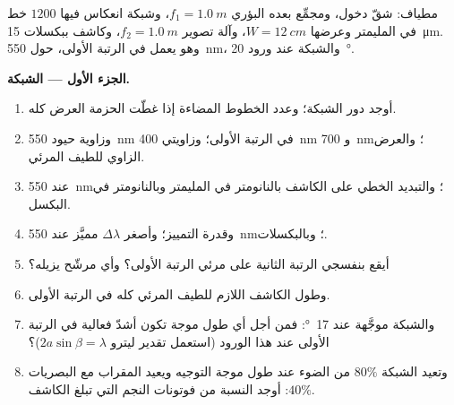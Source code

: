 \begin{problem}
\label{pb:b2:gratings:1}

مطياف: شقّ دخول، ومجمِّع بعده البؤري $f_1 =
\qty{1.0}{m}$، وشبكة انعكاس فيها $1200$ خط في المليمتر وعرضها $W =
\qty{12}{cm}$، وآلة تصوير $f_2 = \qty{1.0}{m}$، وكاشف ببكسلات \qty{15}{\micro m}.
وهو يعمل في الرتبة الأولى، حول \qty{550}{nm}، والشبكة
عند ورود \qty{20}{\degree}.

\medskip
\noindent\textbf{الجزء الأول --- الشبكة.}
\begin{enumerate}
  \item أوجد دور الشبكة؛ وعدد الخطوط المضاءة إذا غطّت الحزمة
        العرض كله.
  \item وزاوية حيود \qty{550}{nm} في الرتبة الأولى؛ وزاويتي
        \qty{400}{nm} و \qty{700}{nm}؛ والعرض الزاوي للطيف
        المرئي.
  \item {} عند \qty{550}{nm}؛ والتبديد الخطي على
        الكاشف بالنانومتر في المليمتر وبالنانومتر في البكسل.
  \item وقدرة التمييز؛ وأصغر $\Delta\lambda$ مميَّز عند \qty{550}{nm}؛
        وبالبكسلات.
  \item أيقع بنفسجي الرتبة الثانية على مرئي الرتبة
        الأولى؟ وأي مرشّح يزيله؟
  \item وطول الكاشف اللازم للطيف المرئي كله في
        الرتبة الأولى.
  \item والشبكة موجَّهة عند \qty{17}{\degree}: فمن أجل أي طول موجة
        تكون أشدّ فعالية في الرتبة الأولى عند هذا الورود (استعمل
        تقدير ليترو $2a\sin\beta = \lambda$)؟
  \item وتعيد الشبكة $80\%$ من الضوء عند طول موجة التوجيه
        ويعيد المقراب مع البصريات $40\%$: أوجد النسبة من فوتونات النجم
        التي تبلغ الكاشف.
\end{enumerate}


\end{problem}
